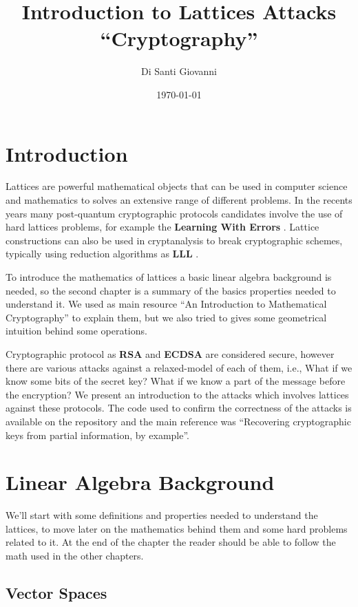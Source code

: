 \documentclass[a4paper,12pt]{report}
\title{Introduction to Lattices Attacks\\``Cryptography''}
\author{Di Santi Giovanni}
\date{\today}
\begin{document}
 
\maketitle

\tableofcontents

\chapter{Introduction}

Lattices are powerful mathematical objects that can be used in computer science and mathematics to solves an extensive range of different problems.
In the recents years many post-quantum cryptographic protocols candidates involve the use of hard lattices problems,
for example the \textbf{Learning With Errors} \cite{LWE}.
Lattice constructions can also be used in cryptanalysis to break cryptographic schemes, typically using reduction
algorithms as \textbf{LLL} \cite{LLL}.

To introduce the mathematics of lattices a basic linear algebra background is needed, so the second chapter is a summary of the
basics properties needed to understand it. We used as main resource ``An Introduction to Mathematical Cryptography''\cite{mathcrypto14} to
explain them, but we also tried to gives some geometrical intuition behind some operations.

Cryptographic protocol as \textbf{RSA} and \textbf{ECDSA} are considered secure, however there are various attacks against a
relaxed-model of each of them, i.e., What if we know some bits of the secret key? What if we know a part of the message before the encryption?
We present an introduction to the attacks which involves lattices against these protocols. The code used to confirm the correctness
of the attacks is available on the repository \cite{repo} and the main reference was
``Recovering cryptographic keys from partial information, by example''\cite{cryptoeprint:2020:1506}.

\chapter{Linear Algebra Background}

We'll start with some definitions and properties needed to understand the lattices, to move later on the mathematics behind them and some
hard problems related to it. At the end of the chapter the reader should be able to follow the math used in the other chapters.

\section{Vector Spaces}
\end{document}
